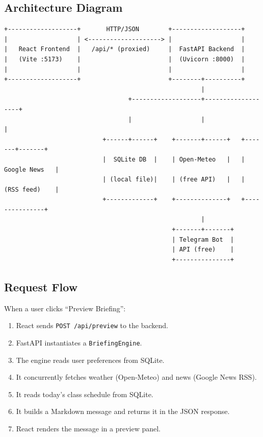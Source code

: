 \documentclass[12pt, a4paper]{article}
\begin{document}
\subsection{Architecture Diagram}

\begin{verbatim}
+-------------------+       HTTP/JSON        +-------------------+
|                   | <--------------------> |                   |
|   React Frontend  |   /api/* (proxied)     |  FastAPI Backend  |
|   (Vite :5173)    |                        |  (Uvicorn :8000)  |
|                   |                        |                   |
+-------------------+                        +--------+----------+
                                                      |
                                  +-------------------+-------------------+
                                  |                   |                   |
                           +------+------+    +-------+------+   +-------+-------+
                           |  SQLite DB  |    | Open-Meteo   |   | Google News   |
                           | (local file)|    | (free API)   |   | (RSS feed)    |
                           +-------------+    +--------------+   +---------------+
                                                      |
                                              +-------+-------+
                                              | Telegram Bot  |
                                              | API (free)    |
                                              +---------------+
\end{verbatim}

\subsection{Request Flow}

When a user clicks ``Preview Briefing'':

\begin{enumerate}[leftmargin=2em]
  \item React sends \texttt{POST /api/preview} to the backend.
  \item FastAPI instantiates a \texttt{BriefingEngine}.
  \item The engine reads user preferences from SQLite.
  \item It concurrently fetches weather (Open-Meteo) and news (Google News RSS).
  \item It reads today's class schedule from SQLite.
  \item It builds a Markdown message and returns it in the JSON response.
  \item React renders the message in a preview panel.
\end{enumerate}
\end{document}
